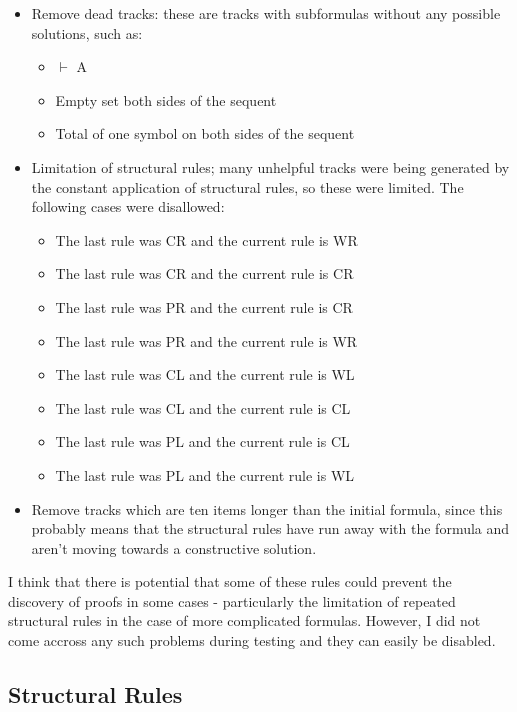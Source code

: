 \documentclass{article}
\begin{document}
\begin{itemize}
  \item Remove dead tracks: these are tracks with subformulas without any
  possible solutions, such as:
  \begin{itemize}
    \item $\vdash$ A
    \item Empty set both sides of the sequent
    \item Total of one symbol on both sides of the sequent
  \end{itemize}

  \item Limitation of structural rules; many unhelpful tracks were being generated by
  the constant application of structural rules, so these were limited. The
  following cases were disallowed:
  \begin{itemize}
    \item The last rule was CR and the current rule is WR
    \item The last rule was CR and the current rule is CR
    \item The last rule was PR and the current rule is CR
    \item The last rule was PR and the current rule is WR
    \item The last rule was CL and the current rule is WL
    \item The last rule was CL and the current rule is CL
    \item The last rule was PL and the current rule is CL
    \item The last rule was PL and the current rule is WL
  \end{itemize}

  \item Remove tracks which are ten items longer than the initial formula, since
  this probably means that the structural rules have run away with the formula
  and aren't moving towards a constructive solution.
\end{itemize}

I think that there is potential that some of these rules could prevent the
discovery of proofs in some cases - particularly the limitation of repeated
structural rules in the case of more complicated formulas. However, I did not
come accross any such problems during testing and they can easily be disabled.

\subsection{Structural Rules}
\end{document}
